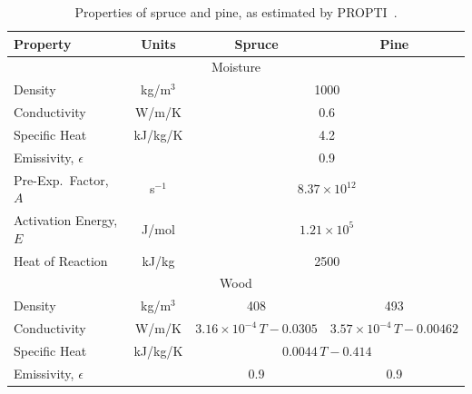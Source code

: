 \begin{table}[h!]
\caption[Properties of spruce and pine]{Properties of spruce and pine, as estimated by PROPTI~\cite{Rinta-Paavola:2023}.}
\begin{center}
\begin{tabular}{|l|c|c|c|}
\hline
Property                     & Units         & Spruce                & Pine                                        \\ \hline \hline
\multicolumn{4}{|c|}{Moisture}                                                                                     \\ \hline
Density                      & kg/m$^3$      & \multicolumn{2}{|c|}{1000}                                          \\ \hline
Conductivity                 & W/m/K         & \multicolumn{2}{|c|}{0.6}                                           \\ \hline
Specific Heat                & kJ/kg/K       & \multicolumn{2}{|c|}{4.2}                                           \\ \hline
Emissivity, $\epsilon$       &               & \multicolumn{2}{|c|}{0.9}                                           \\ \hline
Pre-Exp.~Factor, $A$         & s$^{-1}$      & \multicolumn{2}{|c|}{$8.37 \times 10^{12}$}                         \\ \hline
Activation Energy, $E$       & J/mol         & \multicolumn{2}{|c|}{$1.21 \times 10^{5}$}                          \\ \hline
Heat of Reaction             & kJ/kg         & \multicolumn{2}{|c|}{2500}                                          \\ \hline
\multicolumn{4}{|c|}{Wood}                                                                                         \\ \hline
Density                      & kg/m$^3$      & 408                             & 493                               \\ \hline
Conductivity                 & W/m/K         & $3.16\times 10^{-4}\, T-0.0305$ & $3.57\times 10^{-4}\, T-0.00462$  \\ \hline
Specific Heat                & kJ/kg/K       & \multicolumn{2}{|c|}{$0.0044 \,T - 0.414$}                          \\ \hline
Emissivity, $\epsilon$       &               & 0.9                             & 0.9                               \\ \hline

\end{tabular}
\end{center}
\end{table}
